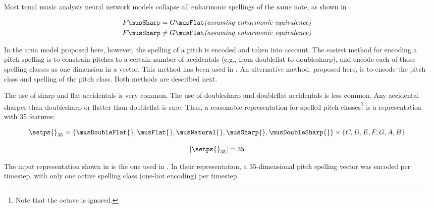 
Most tonal music analysis neural network models collapse all
enharmonic spellings of the same note, as shown in
.

\begin{equation}
    \label{eq:enharmonicity}
    \begin{split}
    F\musSharp = G\musFlat \textit{(assuming enharmonic equivalence)} \\
    F\musSharp \neq G\musFlat \textit{(assuming enharmonic equivalence)} \\
    \end{split}
\end{equation}

In the \gls{arna} model proposed here, however, the spelling
of a pitch is encoded and taken into account. The easiest
method for encoding a pitch spelling is to constrain pitches
to a certain number of accidentals (e.g., from
\gls{doubleflat} to \gls{doublesharp}), and encode each of
those spelling classes as one dimension in a vector. This
method has been used in \textcite{micchi2020not,
micchi2021deep}. An alternative method, proposed here, is to
encode the pitch class and spelling of the pitch class. Both
methods are described next.


The use of \gls{sharp} and \gls{flat}
accidentals is very common. The use of \gls{doublesharp} and
\gls{doubleflat} accidentals is less common. Any accidental
sharper than \gls{doublesharp} or flatter than
\gls{doubleflat} is rare. Thus, a reasonable representation
for spelled pitch classes\footnote{Note that the octave is
ignored.} is a representation with 35 features:

\begin{equation}
    \label{eq:pitch_spelling_35}
    \setps{}_{35} = \{\musDoubleFlat{}, \musFlat{}, 
    \musNatural{}, \musSharp{}, \musDoubleSharp{} \}
    \times 
    \{C, D, E, F, G, A, B \}
\end{equation}

\begin{equation}
    \label{eq:pitch_spelling_35_magnitude}
    | \setps{}_{35} | = 35
\end{equation}

The input representation shown in 
is the one used in \textcite{micchi2020not, micchi2021deep}.
In their representation, a 35-dimensional pitch spelling
vector was encoded per timestep, with only one active
spelling class (one-hot encoding) per timestep.

